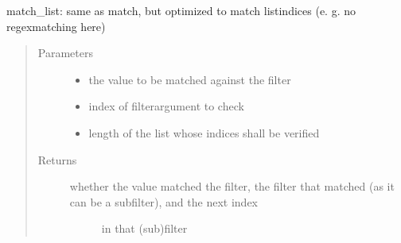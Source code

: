\documentclass[a4paper,10pt,english]{sphinxmanual}
\begin{document}
\begin{fulllineitems}
\begin{fulllineitems}
\end{fulllineitems}


\begin{fulllineitems}
\label{\detokenize{fagus.filters:fagus.filters.KFil.match_list}}
\pysigstartsignatures
{}
\pysigstopsignatures
\sphinxAtStartPar
match\_list: same as match, but optimized to match list\sphinxhyphen{}indices (e. g. no regex\sphinxhyphen{}matching here)
\begin{quote}\begin{description}
\item[{Parameters}] \leavevmode\begin{itemize}
\item {}
\sphinxAtStartPar
{} \textendash{} the value to be matched against the filter

\item {}
\sphinxAtStartPar
{} \textendash{} index of filter\sphinxhyphen{}argument to check

\item {}
\sphinxAtStartPar
{} \textendash{} length of the list whose indices shall be verified

\end{itemize}

\item[{Returns}] \leavevmode
\sphinxAtStartPar
\begin{description}
\item[{whether the value matched the filter, the filter that matched (as it can be a subfilter), and the next index}] \leavevmode
\sphinxAtStartPar
in that (sub)filter


\end{description}
\end{description}
\end{quote}
\end{fulllineitems}
\end{fulllineitems}
\end{document}
